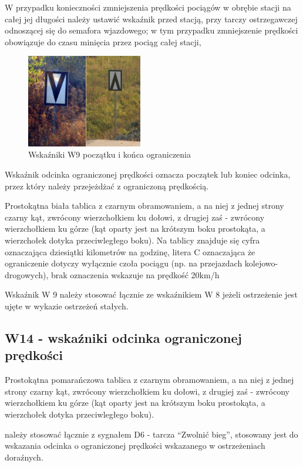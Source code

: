 W przypadku konieczności zmniejszenia prędkości pociągów w obrębie stacji na całej jej długości należy ustawić wskaźnik przed stacją, przy tarczy ostrzegawczej odnoszącej się do semafora wjazdowego; w tym przypadku zmniejszenie prędkości obowiązuje do czasu minięcia przez pociąg całej stacji,
	\begin{figure}
	\includegraphics[width=0.45\textwidth]{skryptkierownik-img/wskazniki-w9.jpg}
	\caption{Wskaźniki W9 początku i końca ograniczenia}
\end{figure}
\begin{tcolorbox}[colback=black!5!white,colframe=white!55!black,title=Wskaźnik W9]
{\textquotedbl}Wskaźnik odcinka ograniczonej prędkości{\textquotedbl} oznacza początek lub koniec odcinka, przez który należy przejeżdżać z ograniczoną prędkością.
\end{tcolorbox} Prostokątna biała tablica z czarnym obramowaniem, a na niej z jednej strony czarny kąt, zwrócony wierzchołkiem ku dołowi, z drugiej zaś - zwrócony wierzchołkiem ku górze (kąt oparty jest na krótszym boku prostokąta, a wierzchołek dotyka przeciwległego boku). Na tablicy znajduje się cyfra oznaczająca dziesiątki kilometrów na godzinę, litera C oznaczająca że ograniczenie dotyczy wyłącznie czoła pociągu (np. na przejazdach kolejowo-drogowych), brak oznaczenia wskazuje na prędkość 20km/h

Wskaźnik W 9 należy stosować łącznie ze wskaźnikiem W 8 jeżeli ostrzeżenie jest ujęte w wykazie ostrzeżeń stałych. 

\subsection{W14 - wskaźniki odcinka ograniczonej prędkości}

Prostokątna pomarańczowa tablica z czarnym obramowaniem, a na niej z jednej strony czarny kąt, zwrócony wierzchołkiem ku dołowi, z drugiej zaś - zwrócony wierzchołkiem ku górze (kąt oparty jest na krótszym boku prostokąta, a wierzchołek dotyka przeciwległego boku). 
\begin{tcolorbox}[colback=black!5!white,colframe=white!55!black,title=Wskaźnik W14] należy stosować łącznie z sygnałem D6 - tarcza “Zwolnić bieg”, stosowany jest do wskazania odcinka o ograniczonej prędkości wskazanego w ostrzeżeniach doraźnych. 
\end{tcolorbox}

